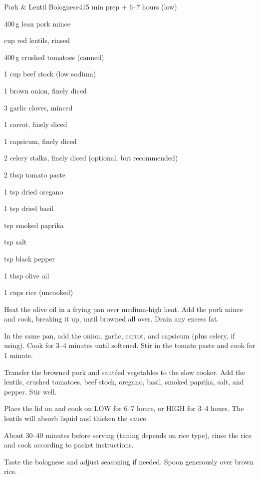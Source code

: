 \begin{recipebox}{Pork \& Lentil Bolognese}{4}{15 min prep + 6--7 hours (low)}

\begin{ingredients}
  \item 400\,g lean pork mince
  \item {} cup red lentils, rinsed
  \item 400\,g crushed tomatoes (canned)
  \item 1 cup beef stock (low sodium)
  \item 1 brown onion, finely diced
  \item 3 garlic cloves, minced
  \item 1 carrot, finely diced
  \item 1 capsicum, finely diced
  \item 2 celery stalks, finely diced (optional, but recommended)
  \item 2 tbsp tomato paste
  \item 1 tsp dried oregano
  \item 1 tsp dried basil
  \item {} tsp smoked paprika
  \item {} tsp salt
  \item {} tsp black pepper
  \item 1 tbsp olive oil
  \item 1 cups rice (uncooked)
\end{ingredients}

\begin{method}
  \item Heat the olive oil in a frying pan over medium-high heat. Add the pork mince and cook, breaking it up, until browned all over. Drain any excess fat.
  \item In the same pan, add the onion, garlic, carrot, and capsicum (plus celery, if using). Cook for 3--4 minutes until softened. Stir in the tomato paste and cook for 1 minute.
  \item Transfer the browned pork and saut\'eed vegetables to the slow cooker. Add the lentils, crushed tomatoes, beef stock, oregano, basil, smoked paprika, salt, and pepper. Stir well.
  \item Place the lid on and cook on LOW for 6--7 hours, or HIGH for 3--4 hours. The lentils will absorb liquid and thicken the sauce.
  \item About 30--40 minutes before serving (timing depends on rice type), rinse the rice and cook according to packet instructions.
  \item Taste the bolognese and adjust seasoning if needed. Spoon generously over brown rice.
\end{method}


\end{recipebox}
